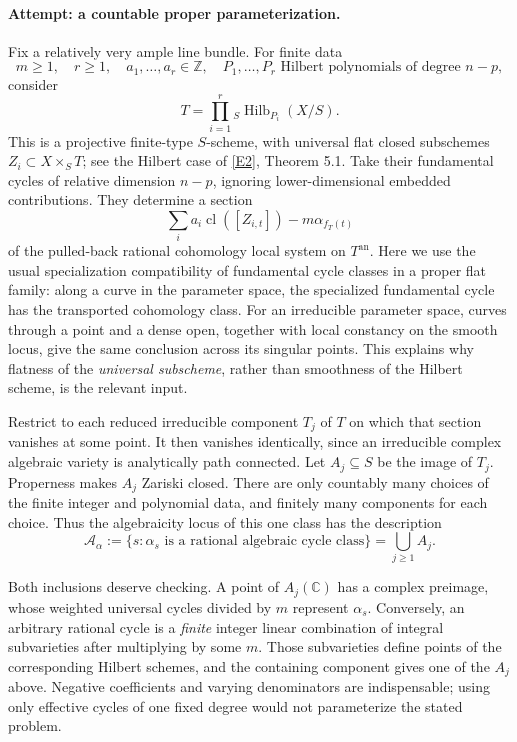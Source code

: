 \documentclass[11pt,a4paper]{article}
\newcommand{\Z}{\mathbb{Z}}
\newcommand{\C}{\mathbb{C}}
\newcommand{\eref}[2]{\hyperlink{extra:#1:#2}{[E#2]}}
\numberwithin{equation}{section}
\begin{document}
\paragraph{Attempt: a countable proper parameterization.}
Fix a relatively very ample line bundle. For finite data
\[
 m\ge1,\quad r\ge1,\quad a_1,\ldots,a_r\in\Z,
 \quad P_1,\ldots,P_r\text{ Hilbert polynomials of degree }n-p,
\]
consider
\begin{equation}\label{eq157-hilbert}
 T=\prod_{i=1}^r{}_S\operatorname{Hilb}_{P_i}(X/S).
\end{equation}
This is a projective finite-type $S$-scheme, with universal flat closed
subschemes $Z_i\subset X\times_ST$; see the Hilbert case of
\eref{statement}{2}, Theorem 5.1. Take their fundamental cycles of relative
dimension $n-p$, ignoring lower-dimensional embedded contributions.
They determine a section
\[
 \sum_i a_i\operatorname{cl}([Z_{i,t}])-m\alpha_{f_T(t)}
\]
of the pulled-back rational cohomology local system on $T^{\mathrm{an}}$.
Here we use the usual specialization compatibility of fundamental cycle
classes in a proper flat family: along a curve in the parameter space,
the specialized fundamental cycle has the transported cohomology class.
For an irreducible parameter space, curves through a point and a dense
open, together with local constancy on the smooth locus, give the same
conclusion across its singular points. This explains why flatness of the
\emph{universal subscheme}, rather than smoothness of the Hilbert scheme,
is the relevant input.

Restrict to each reduced irreducible component $T_j$ of $T$ on which that
section vanishes at some point. It then vanishes identically, since an
irreducible complex algebraic variety is analytically path connected.
Let $A_j\subseteq S$ be the image of $T_j$. Properness makes $A_j$ Zariski
closed. There are only countably many choices of the finite integer and
polynomial data, and finitely many components for each choice. Thus the
algebraicity locus of this one class has the description
\begin{equation}\label{eq157-locus}
 \mathcal A_\alpha:=
 \{s:\alpha_s\text{ is a rational algebraic cycle class}\}
 =\bigcup_{j\ge1}A_j.
\end{equation}

Both inclusions deserve checking. A point of $A_j(\C)$ has a complex
preimage, whose weighted universal cycles divided by $m$ represent
$\alpha_s$. Conversely, an arbitrary rational cycle is a \emph{finite}
integer linear combination of integral subvarieties after multiplying by
some $m$. Those subvarieties define points of the corresponding Hilbert
schemes, and the containing component gives one of the $A_j$ above.
Negative coefficients and varying denominators are indispensable; using
only effective cycles of one fixed degree would not parameterize the
stated problem.
\end{document}
